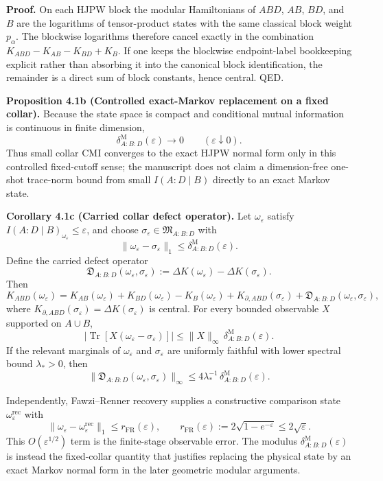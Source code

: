 \textbf{Proof.} On each HJPW block the modular Hamiltonians of \(ABD\), \(AB\), \(BD\), and \(B\) are the logarithms of tensor-product states with the same classical block weight \(p_\alpha\). The blockwise logarithms therefore cancel exactly in the combination \(K_{ABD}-K_{AB}-K_{BD}+K_B\). If one keeps the blockwise endpoint-label bookkeeping explicit rather than absorbing it into the canonical block identification, the remainder is a direct sum of block constants, hence central. QED.

\textbf{Proposition 4.1b (Controlled exact-Markov replacement on a fixed collar).}
Because the state space is compact and conditional mutual information is continuous in finite dimension,
\[
\delta^{\mathrm M}_{A:B:D}(\varepsilon)\longrightarrow 0
\qquad
(\varepsilon\downarrow0).
\]
Thus small collar CMI converges to the exact HJPW normal form only in this controlled fixed-cutoff sense; the manuscript does not claim a dimension-free one-shot trace-norm bound from small \(I(A:D\mid B)\) directly to an exact Markov state.

\textbf{Corollary 4.1c (Carried collar defect operator).} Let \(\omega_\varepsilon\) satisfy \(I(A:D\mid B)_{\omega_\varepsilon}\le \varepsilon\), and choose \(\sigma_\varepsilon\in\mathfrak M_{A:B:D}\) with
\[
\|\omega_\varepsilon-\sigma_\varepsilon\|_1
\le
\delta^{\mathrm M}_{A:B:D}(\varepsilon).
\]
Define the carried defect operator
\[
\mathfrak D_{A:B:D}(\omega_\varepsilon,\sigma_\varepsilon)
:=
\Delta K(\omega_\varepsilon)-\Delta K(\sigma_\varepsilon).
\]
Then
\[
K_{ABD}(\omega_\varepsilon)
=
K_{AB}(\omega_\varepsilon)+K_{BD}(\omega_\varepsilon)-K_B(\omega_\varepsilon)
+K_{\partial,ABD}(\sigma_\varepsilon)
+\mathfrak D_{A:B:D}(\omega_\varepsilon,\sigma_\varepsilon),
\]
where \(K_{\partial,ABD}(\sigma_\varepsilon)=\Delta K(\sigma_\varepsilon)\) is central. For every bounded observable \(X\) supported on \(A\cup B\),
\[
\left|
\operatorname{Tr}\!\left[X(\omega_\varepsilon-\sigma_\varepsilon)\right]
\right|
\le
\|X\|_\infty\,\delta^{\mathrm M}_{A:B:D}(\varepsilon).
\]
If the relevant marginals of \(\omega_\varepsilon\) and \(\sigma_\varepsilon\) are uniformly faithful with lower spectral bound \(\lambda_\ast>0\), then
\[
\|\mathfrak D_{A:B:D}(\omega_\varepsilon,\sigma_\varepsilon)\|_\infty
\le
4\lambda_\ast^{-1}\,\delta^{\mathrm M}_{A:B:D}(\varepsilon).
\]

Independently, Fawzi--Renner recovery supplies a constructive comparison state \(\omega^{\mathrm{rec}}_\varepsilon\) with
\[
\|\omega_\varepsilon-\omega^{\mathrm{rec}}_\varepsilon\|_1
\le
r_{\mathrm{FR}}(\varepsilon),
\qquad
r_{\mathrm{FR}}(\varepsilon):=2\sqrt{1-e^{-\varepsilon}}\le 2\sqrt{\varepsilon}.
\]
This \(O(\varepsilon^{1/2})\) term is the finite-stage observable error. The modulus \(\delta^{\mathrm M}_{A:B:D}(\varepsilon)\) is instead the fixed-collar quantity that justifies replacing the physical state by an exact Markov normal form in the later geometric modular arguments.

